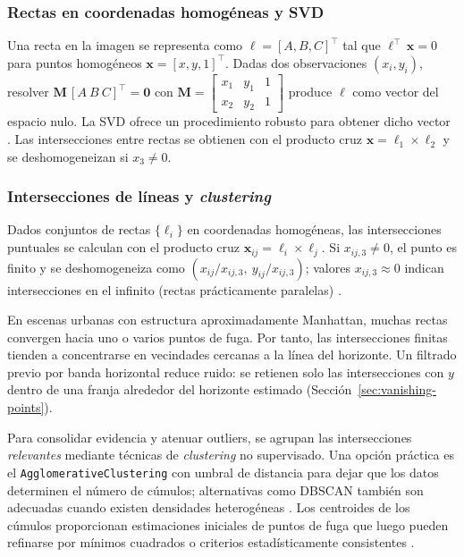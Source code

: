 \subsubsection{Rectas en coordenadas homogéneas y SVD}\label{sec:rectas-svd}
\noindent
Una recta en la imagen se representa como \(\ell=[A,B,C]^\top\) tal que \(\ell^\top\,\mathbf{x}=0\) para puntos homogéneos \(\mathbf{x}=[x,y,1]^\top\). Dadas dos observaciones \((x_i,y_i)\), resolver \(\mathbf{M}\,[A\ B\ C]^\top=\mathbf{0}\) con \(\mathbf{M}=\begin{bmatrix}x_1&y_1&1\\x_2&y_2&1\end{bmatrix}\) produce \(\ell\) como vector del espacio nulo. La SVD ofrece un procedimiento robusto para obtener dicho vector \cite{golub2013matrix}. Las intersecciones entre rectas se obtienen con el producto cruz \(\mathbf{x}=\ell_1\times\ell_2\) y se deshomogeneizan si \(x_3\neq 0\).

\subsubsection{Intersecciones de líneas y \textit{clustering}}\label{sec:intersections-clustering}
\noindent
Dados conjuntos de rectas \(\{\ell_i\}\) en coordenadas homogéneas, las intersecciones puntuales se calculan con el producto cruz
\(\mathbf{x}_{ij} = \ell_i \times \ell_j\). Si \(x_{ij,3} \neq 0\), el punto es finito y se deshomogeneiza como \( (x_{ij}/x_{ij,3},\ y_{ij}/x_{ij,3}) \); valores \(x_{ij,3} \approx 0\) indican intersecciones en el infinito (rectas prácticamente paralelas) \cite{hartley2003multiple}.

\noindent
En escenas urbanas con estructura aproximadamente Manhattan, muchas rectas convergen hacia uno o varios puntos de fuga. Por tanto, las
intersecciones finitas tienden a concentrarse en vecindades cercanas a la línea del horizonte. Un filtrado previo por banda horizontal
reduce ruido: se retienen solo las intersecciones con \(y\) dentro de una franja alrededor del horizonte estimado (Sección~\ref{sec:vanishing-points}).

\noindent
Para consolidar evidencia y atenuar outliers, se agrupan las intersecciones \emph{relevantes} mediante técnicas de \textit{clustering} no supervisado.
Una opción práctica es el \texttt{AgglomerativeClustering} con umbral de distancia para dejar que los datos determinen el número de cúmulos; alternativas
como DBSCAN también son adecuadas cuando existen densidades heterogéneas \cite{tan2005introduction}. Los centroides de los cúmulos proporcionan
estimaciones iniciales de puntos de fuga que luego pueden refinarse por mínimos cuadrados o criterios estadísticamente consistentes
\cite{kanatani1998statistical,hartley2003multiple}.

